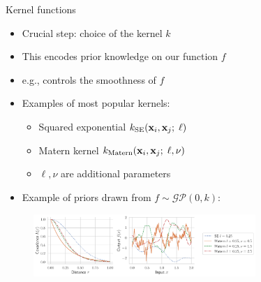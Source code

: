 \documentclass{beamer}
\begin{document}

\begin{frame}{Kernel functions}
\begin{itemize}[<+->]
    \item Crucial step: choice of the kernel $k$
    \item This encodes prior knowledge on our function $f$
    \item e.g., controls the smoothness of $f$
    \item Examples of most popular kernels:
    \begin{itemize}
        \item Squared exponential $k_\text{SE}(\boldsymbol{\mathbf{x}}_i, \boldsymbol{\mathbf{x}}_j ; \; \ell)$
        \item Matern kernel $k_\text{Matern}(\boldsymbol{\mathbf{x}}_i, \boldsymbol{\mathbf{x}}_j ; \; \ell, \nu)$
        \item $\ell, \nu$ are additional parameters
    \end{itemize}
    \item Example of priors drawn from $f \sim \mathcal{GP}(0, k)$:
\end{itemize}
\pause\begin{figure}
    \centering
    \includegraphics[clip, trim=11cm 0cm 0cm 0cm, width=0.75\textwidth]{res/covariance_overview.pdf}
    \label{fig:my_label}
\end{figure}
\end{frame}
\end{document}
